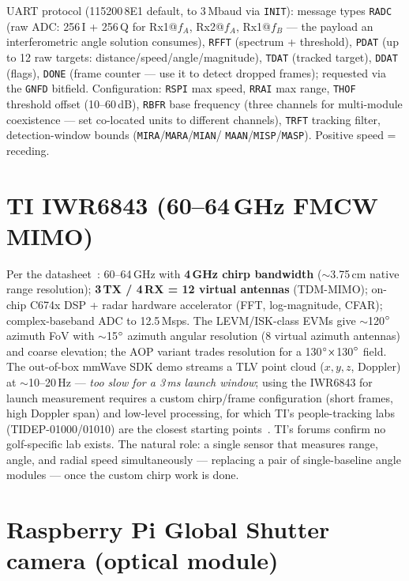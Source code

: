 UART protocol (115200\,8E1 default, to 3\,Mbaud via \texttt{INIT}):
message types \texttt{RADC} (raw ADC: 256\,I + 256\,Q for Rx1@$f_A$,
Rx2@$f_A$, Rx1@$f_B$ --- the payload an interferometric angle solution
consumes), \texttt{RFFT} (spectrum + threshold), \texttt{PDAT} (up to
12 raw targets: distance/speed/angle/magnitude), \texttt{TDAT}
(tracked target), \texttt{DDAT} (flags), \texttt{DONE} (frame counter
--- use it to detect dropped frames); requested via the \texttt{GNFD}
bitfield. Configuration: \texttt{RSPI} max speed, \texttt{RRAI} max
range, \texttt{THOF} threshold offset (10--60\,dB), \texttt{RBFR} base
frequency (three channels for multi-module coexistence --- set
co-located units to different channels), \texttt{TRFT} tracking filter,
detection-window bounds (\texttt{MIRA}/\texttt{MARA}/\texttt{MIAN}/
\texttt{MAAN}/\texttt{MISP}/\texttt{MASP}). Positive speed = receding.

\section{TI IWR6843 (60--64\,GHz FMCW MIMO)}

Per the datasheet~\cite{iwr6843}: 60--64\,GHz with \textbf{4\,GHz
chirp bandwidth} ($\sim$3.75\,cm native range resolution);
\textbf{3\,TX / 4\,RX = 12 virtual antennas} (TDM-MIMO); on-chip
C674x DSP + radar hardware accelerator (FFT, log-magnitude, CFAR);
complex-baseband ADC to 12.5\,Msps. The LEVM/ISK-class EVMs give
$\sim$120$\si{\degree}$ azimuth FoV with $\sim$15$\si{\degree}$ azimuth angular
resolution (8 virtual azimuth antennas) and coarse elevation; the AOP
variant trades resolution for a 130$\si{\degree}\times$130$\si{\degree}$ field. The
out-of-box mmWave SDK demo streams a TLV point cloud
($x,y,z$, Doppler) at $\sim$10--20\,Hz --- \emph{too slow for a 3\,ms
launch window}; using the IWR6843 for launch measurement requires a
custom chirp/frame configuration (short frames, high Doppler span) and
low-level processing, for which TI's people-tracking labs
(TIDEP-01000/01010) are the closest starting points~\cite{iwr6843}.
TI's forums confirm no golf-specific lab exists. The natural
role: a single sensor that measures range, angle, and radial speed
simultaneously --- replacing a pair of single-baseline angle modules ---
once the custom chirp work is done.

\section{Raspberry Pi Global Shutter camera (optical module)}


